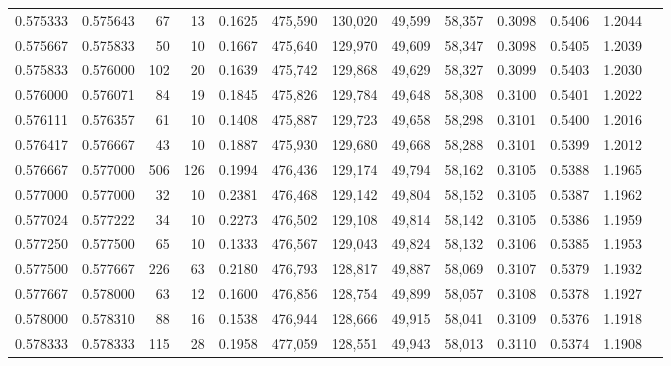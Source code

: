 \begin{tabular}{rrrrrrrrrrrrr}
0.575333 & 0.575643 &    67 &  13 &                                     0.1625 & 475,590 & 130,020 &  49,599 &  58,357 & 0.3098 & 0.5406 & 1.2044 \\
0.575667 & 0.575833 &    50 &  10 &                                     0.1667 & 475,640 & 129,970 &  49,609 &  58,347 & 0.3098 & 0.5405 & 1.2039 \\
0.575833 & 0.576000 &   102 &  20 &                                     0.1639 & 475,742 & 129,868 &  49,629 &  58,327 & 0.3099 & 0.5403 & 1.2030 \\
0.576000 & 0.576071 &    84 &  19 &                                     0.1845 & 475,826 & 129,784 &  49,648 &  58,308 & 0.3100 & 0.5401 & 1.2022 \\
0.576111 & 0.576357 &    61 &  10 &                                     0.1408 & 475,887 & 129,723 &  49,658 &  58,298 & 0.3101 & 0.5400 & 1.2016 \\
0.576417 & 0.576667 &    43 &  10 &                                     0.1887 & 475,930 & 129,680 &  49,668 &  58,288 & 0.3101 & 0.5399 & 1.2012 \\
0.576667 & 0.577000 &   506 & 126 &                                     0.1994 & 476,436 & 129,174 &  49,794 &  58,162 & 0.3105 & 0.5388 & 1.1965 \\
0.577000 & 0.577000 &    32 &  10 &                                     0.2381 & 476,468 & 129,142 &  49,804 &  58,152 & 0.3105 & 0.5387 & 1.1962 \\
0.577024 & 0.577222 &    34 &  10 &                                     0.2273 & 476,502 & 129,108 &  49,814 &  58,142 & 0.3105 & 0.5386 & 1.1959 \\
0.577250 & 0.577500 &    65 &  10 &                                     0.1333 & 476,567 & 129,043 &  49,824 &  58,132 & 0.3106 & 0.5385 & 1.1953 \\
0.577500 & 0.577667 &   226 &  63 &                                     0.2180 & 476,793 & 128,817 &  49,887 &  58,069 & 0.3107 & 0.5379 & 1.1932 \\
0.577667 & 0.578000 &    63 &  12 &                                     0.1600 & 476,856 & 128,754 &  49,899 &  58,057 & 0.3108 & 0.5378 & 1.1927 \\
0.578000 & 0.578310 &    88 &  16 &                                     0.1538 & 476,944 & 128,666 &  49,915 &  58,041 & 0.3109 & 0.5376 & 1.1918 \\
0.578333 & 0.578333 &   115 &  28 &                                     0.1958 & 477,059 & 128,551 &  49,943 &  58,013 & 0.3110 & 0.5374 & 1.1908 \\

\end{tabular}
